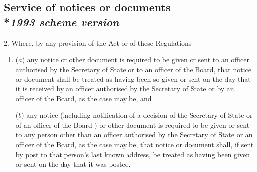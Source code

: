 \documentclass[12pt,a4paper]{article}
\begin{document}
\subsection[2. Service of notices or documents --- \emph{1993 scheme version}]{Service of notices or documents\\*\emph{1993 scheme version}}

2.  Where, by any provision of the Act or of these Regulations—
\begin{enumerate}\item[]
($a$) any notice or other document is required to be given or sent 
to an officer authorised by the Secretary of State
or to an officer of the Board,  %
that notice or document shall be treated as having been so given or sent on the day that it is received 
by an officer authorised by the Secretary of State
or by an officer of the Board,  %
as the case may be, and

($b$) any notice (including notification of a decision of the Secretary of State
or of an officer of the Board%
) or other document is required to be given or sent to any person other than 
an officer  %
authorised by the Secretary of State
or an officer of the Board,  %
as the case may be, that notice or document shall, if sent by post to that person’s last known address, be treated as having been given or sent on the day that it was posted.
\end{enumerate}

\end{document}

